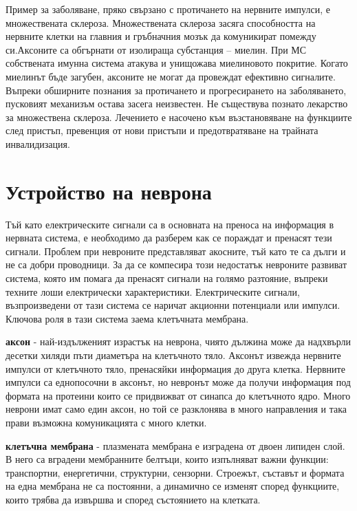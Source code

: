 \documentclass{article}
\begin{document}
Пример за заболяване, пряко свързано с протичането на нервните импулси, е множествената склероза. Множествената склероза засяга способността на нервните клетки на главния и гръбначния мозък да комуникират помежду си.Аксоните са обгърнати от изолираща субстанция – миелин. При МС собствената имунна система атакува и унищожава миелиновото покритие. Когато миелинът бъде загубен, аксоните не могат да провеждат ефективно сигналите. Въпреки обширните познания за протичането и прогресирането на заболяването, пусковият механизъм остава засега неизвестен. Не съществува познато лекарство за множествена склероза. Лечението е насочено към възстановяване на функциите след пристъп, превенция от нови пристъпи и предотвратяване на трайната инвалидизация.

\section{Устройство на неврона}
Тъй като електрическите сигнали са в основната на преноса на информация в нервната система, е необходимо да разберем как се пораждат и пренасят тези сигнали. Проблем при невроните представляват акосните, тъй като те са дълги и не са добри проводници. За да се компесира този недостатък невроните развиват система, която им помага да пренасят сигнали на голямо разтояние, въпреки техните лоши електрически характеристики.  Електрическите сигнали, възпроизведени от тази система се наричат акционни потенциали или импулси. Ключова роля в тази система заема клетъчната мембрана.


\textbf{аксон} - най-издълженият израстък на неврона, чиято дължина може да надхвърли десетки хиляди пъти диаметъра на клетъчното тяло. Аксонът
извежда нервните импулси от клетъчното тяло, пренасяйки информация до друга клетка. Нервните импулси са еднопосочни в аксонът, но невронът
може да получи информация под формата на протеини които се придвижват от синапса до клетъчното ядро. Много неврони имат само един аксон, но
той се разклонява в много направления и така прави възможна комуникацията с много клетки. 

\textbf{клетъчна мембрана} - плазмената мембрана е изградена от двоен липиден слой. В него са вградени мембранните белтъци, които изпълняват важни функции: транспортни, енергетични, структурни, сензорни. Строежът, съставът и формата на една мембрана не са постоянни, а динамично се изменят според функциите, които трябва да извършва и според състоянието на клетката.
\end{document}
